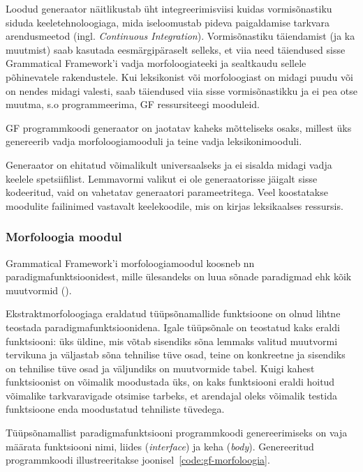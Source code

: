 \documentclass[12pt,a4paper]{article}
\begin{document}
Loodud generaator näitlikustab üht integreerimis\-viisi kuidas vormisõnastiku siduda keele\-tehnoloogiaga, mida iseloomustab pideva paigaldamise tarkvara arendusmeetod (ingl. \textit{Continuous Integration}). Vormisõnastiku täiendamist (ja ka muutmist) saab kasutada eesmärgipäraselt selleks, et viia need täiendused sisse Grammatical Framework'i vadja morfoloogia\-teeki ja sealt\-kaudu sellele põhinevatele rakendustele. Kui leksikonist või morfoloogiast on midagi puudu või on nendes midagi valesti, saab täiendused viia sisse vormi\-sõnastikku ja ei pea otse muutma, s.o programmeerima, GF ressursi\-teegi mooduleid.

GF programmkoodi generaator on jaotatav kaheks mõtteliseks osaks, millest üks genereerib vadja morfoloogia\-mooduli ja teine vadja leksikoni\-mooduli.

Generaator on ehitatud võimalikult universaalseks ja ei sisalda midagi vadja keelele spetsiifilist. Lemmavormi valikut ei ole generaatorisse jäigalt sisse kodeeritud, vaid on vahetatav generaatori parameetritega. Veel koostatakse moodulite faili\-nimed vastavalt keele\-koodile, mis on kirjas leksikaalses ressursis.



\subsubsection{Morfoloogia moodul}
\label{sec:gf-tüüpsõnad}
Grammatical Framework'i morfoloogiamoodul koosneb nn paradigma\-funktsioonidest, mille ülesandeks on luua sõnade paradigmad ehk kõik muutvormid (\cites[248]{ranta_grammatical_2011}[645]{detrez_smart_2012}).

Ekstrakt\-morfoloogiaga eraldatud tüüpsõna\-mallide funktsioone on olnud lihtne teostada paradigma\-funktsioonidena. Igale tüüpsõnale on teostatud kaks eraldi funktsiooni: üks üldine, mis võtab sisendiks sõna lemmaks valitud muutvormi tervikuna ja väljastab sõna tehnilise tüve osad, teine on konkreetne ja sisendiks on tehnilise tüve osad ja väljundiks on muutvormide tabel. Kuigi kahest funktsioonist on võimalik moodustada üks, on kaks funktsiooni eraldi hoitud võimalike tarkvara\-vigade otsimise tarbeks, et arendajal oleks võimalik testida funktsioone enda moodustatud tehniliste tüvedega.

Tüüpsõnamallist paradigmafunktsiooni programmkoodi genereerimiseks on vaja määrata funktsiooni nimi, liides (\textit{interface}) ja keha (\textit{body}). Genereeritud programm\-koodi illustreeritakse joonisel~\ref{code:gf-morfoloogia}. %
\end{document}
